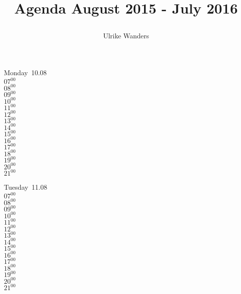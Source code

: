 \documentclass[11pt,a4paper]{book}\usepackage[]{graphicx}\usepackage[]{color}
\def\lsin{\lstinline[basicstyle=\ttfamily,breaklines=true,]}%for inline verbatim
\begin{document}
\begin{titlepage}
\title{\parbox{\linewidth}{%
  \centering%
  Agenda\endgraf
  August 2015 - July 2016%
  }
}
\author{\parbox{\linewidth}{%
  \centering%
  Ulrike Wanders%
  }
}
\date{}
\maketitle
\end{titlepage}


\begin{headerbox}
\end{headerbox}
\begin{weekdaybox}
  Monday~10.08\\
  { 
  \vfill
  $07^{00}$\\
$08^{00}$\\
$09^{00}$\\
$10^{00}$\\
$11^{00}$\\
$12^{00}$\\
$13^{00}$\\
$14^{00}$\\
$15^{00}$\\
$16^{00}$\\
$17^{00}$\\
$18^{00}$\\
$19^{00}$\\
$20^{00}$\\
$21^{00}$\\
  }
\end{weekdaybox}
\begin{weekdaybox}
  Tuesday~11.08\\
  { 
  \vfill
  $07^{00}$\\
$08^{00}$\\
$09^{00}$\\
$10^{00}$\\
$11^{00}$\\
$12^{00}$\\
$13^{00}$\\
$14^{00}$\\
$15^{00}$\\
$16^{00}$\\
$17^{00}$\\
$18^{00}$\\
$19^{00}$\\
$20^{00}$\\
$21^{00}$\\
  }
\end{weekdaybox}
\end{document}
